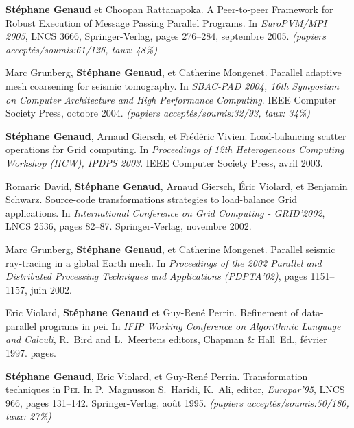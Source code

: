 \documentclass[11pt]{article}
\begin{document}
\begin{thebibliography}{99}
\textbf{Stéphane Genaud} et Choopan Rattanapoka.
\newblock A Peer-to-peer Framework for Robust Execution of Message Passing 
Parallel Programs.
\newblock 
In {\em EuroPVM/MPI 2005}, LNCS 3666, Springer-Verlag, pages 276--284, 
septembre 2005.
\newblock \small{\textit{(papiers acceptés/soumis:61/126, taux: 48\%)}}


Marc Grunberg, \textbf{Stéphane Genaud}, et Catherine Mongenet.
\newblock Parallel adaptive mesh coarsening for seismic tomography.
\newblock In {\em SBAC-PAD 2004, 16th Symposium on Computer Architecture and
  High Performance Computing}. IEEE Computer Society Press, octobre 2004.
\newblock \small{\textit{(papiers acceptés/soumis:32/93, taux: 34\%)}}

\textbf{Stéphane Genaud}, Arnaud Giersch, et Frédéric Vivien.
\newblock Load-balancing scatter operations for Grid computing.
\newblock In {\em Proceedings of 12th Heterogeneous Computing Workshop 
(HCW), IPDPS 2003}. IEEE Computer Society Press, avril 2003.

Romaric David, \textbf{Stéphane Genaud}, Arnaud Giersch, \'{E}ric Violard, et 
  Benjamin Schwarz.
\newblock Source-code transformations strategies to load-balance Grid
  applications.
\newblock In {\em International Conference on Grid Computing - GRID'2002}, 
LNCS 2536, pages 82--87. Springer-Verlag, novembre 2002.

Marc Grunberg, \textbf{Stéphane Genaud}, et Catherine Mongenet.
\newblock Parallel seismic ray-tracing in a global {E}arth mesh.
\newblock In {\em Proceedings of the 2002 Parallel and Distributed Processing
  Techniques and Applications (PDPTA'02)}, pages 1151--1157, juin 2002.

Eric Violard, \textbf{Stéphane Genaud} et Guy-René Perrin.
\newblock Refinement of data-parallel programs in pei.
\newblock In {\em IFIP Working Conference on Algorithmic Language and Calculi}, 
R.~Bird and L.~Meertens editors, Chapman \& Hall~Ed., février 1997.
 pages.

\textbf{Stéphane Genaud}, Eric Violard, et Guy-René Perrin.
\newblock Transformation techniques in \textsc{Pei}.
\newblock In P.~Magnusson S.~Haridi, K.~Ali, editor, {\em Europar'95}, LNCS
  966, pages 131--142. Springer-Verlag, août 1995.
\newblock \small{\textit{(papiers acceptés/soumis:50/180, taux: 27\%)}}





\end{thebibliography}
\end{document}
